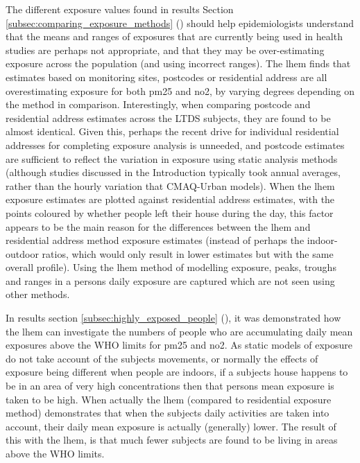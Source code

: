 The different exposure values found in results Section \ref{subsec:comparing_exposure_methods} () should help epidemiologists understand that the means and ranges of exposures that are currently being used in health studies are perhaps not appropriate, and that they may be over-estimating exposure across the population (and using incorrect ranges). The \gls{lhem} finds that estimates based on monitoring sites, postcodes or residential address are all overestimating exposure for both \gls{pm25} and \gls{no2}, by varying degrees depending on the method in comparison. Interestingly, when comparing postcode and residential address estimates across the LTDS subjects, they are found to be almost identical. Given this, perhaps the recent drive for individual residential addresses for completing exposure analysis is unneeded, and postcode estimates are sufficient to reflect the variation in exposure using static analysis methods (although studies discussed in the Introduction typically took annual averages, rather than the hourly variation that CMAQ-Urban models). When the \gls{lhem} exposure estimates are plotted against residential address estimates, with the points coloured by whether people left their house during the day, this factor appears to be the main reason for the differences between the \gls{lhem} and residential address method exposure estimates (instead of perhaps the indoor-outdoor ratios, which would only result in lower estimates but with the same overall profile). Using the \gls{lhem} method of modelling exposure, peaks, troughs and ranges in a persons daily exposure are captured which are not seen using other methods.


In results section \ref{subsec:highly_exposed_people} (), it was demonstrated how the \gls{lhem} can investigate the numbers of people who are accumulating daily mean exposures above the WHO limits for \gls{pm25} and \gls{no2}. As static models of exposure do not take account of the subjects movements, or normally the effects of exposure being different when people are indoors, if a subjects house happens to be in an area of very high concentrations then that persons mean exposure is taken to be high. When actually the \gls{lhem} (compared to residential exposure method) demonstrates that when the subjects daily activities are taken into account, their daily mean exposure is actually (generally) lower. The result of this with the \gls{lhem}, is that much fewer subjects are found to be living in areas above the WHO limits.


